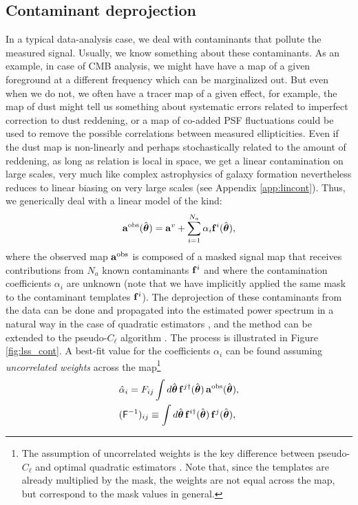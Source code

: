 \documentclass[usenatbib]{mnrasb}
\newcommand{\nv}{\hat{\boldsymbol{\theta}}}
\begin{document}
    \subsection{Contaminant deprojection}\label{ssec:maths.deproj}
      In a typical data-analysis case, we deal with contaminants that pollute the measured signal. Usually, we know something about these contaminants. As an example, in case of CMB analysis, we might have have a map of a given foreground at a different frequency which can be marginalized out. But even when we do not, we often have a tracer map of a given effect, for example, the map of dust might tell us something about systematic errors related to imperfect correction to dust reddening, or a map of co-added PSF fluctuations could be used to remove the possible correlations between measured ellipticities. Even if the dust map is non-linearly and perhaps stochastically related to the amount of reddening, as long as relation is local in space, we get a linear contamination on large scales, very much like complex astrophysics of galaxy formation nevertheless reduces to linear biasing on very large scales (see Appendix \ref{app:lincont}). Thus, we generically deal with a linear model of the kind:
      \begin{equation}\label{eq:aobs}
        {\bf a}^{\rm obs}(\nv)={\bf a}^v+\sum_{i=1}^{N_a}\alpha_i{\bf f}^i(\nv),
      \end{equation}
      where the observed map ${\bf a}^{\rm obs}$ is composed of a masked signal map that receives contributions from $N_a$ known contaminants ${\bf f}^i$ and where the contamination coefficients $\alpha_i$ are unknown (note that we have implicitly applied the same mask to the contaminant templates ${\bf f}^i$). The deprojection of these contaminants from the data can be done and propagated into the estimated power spectrum in a natural way in the case of quadratic estimators \citep{1992ApJ...398..169R,2004PhRvD..69l3003S,2016MNRAS.456.2095E}, and the method can be extended to the pseudo-$C_\ell$ algorithm \citep{2017MNRAS.465.1847E}. The process is illustrated in Figure \ref{fig:lss_cont}. A best-fit value for the coefficients $\alpha_i$ can be found assuming \emph{uncorrelated weights} across the map\footnote{The assumption of uncorrelated weights is the key difference between pseudo-$C_\ell$ and optimal quadratic estimators \citep{2013MNRAS.435.1857L}. Note that, since the templates are already multiplied by the mask, the weights are not equal across the map, but correspond to the mask values in general.}
      \begin{align}\label{eq:deproj_coeff}
        &\hat{\alpha}_i=F_{ij}\int d\nv\,{\bf f}^{j\dag}(\nv)\,{\bf a}^{\rm obs}(\nv),\\\nonumber
        &({\sf F}^{-1})_{ij}\equiv\int d\nv\, {\bf f}^{i\dag}(\nv)\,{\bf f}^j(\nv),
      \end{align}
\end{document}
